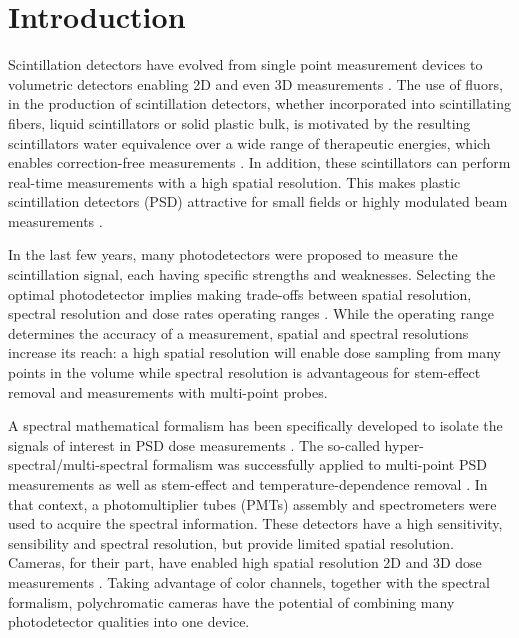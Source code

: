 \documentclass[12pt]{iopart}
\begin{document}
\maketitle

\section{Introduction}

Scintillation detectors have evolved from single point measurement devices to volumetric detectors enabling 2D and even 3D measurements \cite{beaulieu_review_2016}. The use of fluors, in the production of scintillation detectors, whether incorporated into scintillating fibers, liquid scintillators or solid plastic bulk, is motivated by the resulting scintillators water equivalence over a wide range of therapeutic energies, which enables correction-free measurements \cite{beddar_water-equivalent_1992, beddar_water-equivalent_1992-1}. In addition, these scintillators can perform real-time measurements with a high spatial resolution. This makes plastic scintillation detectors (PSD) attractive for small fields or highly modulated beam measurements \cite{Xue_2017_small_field}. 

In the last few years, many photodetectors were proposed to measure the scintillation signal, each having specific strengths and weaknesses. Selecting the optimal photodetector implies making trade-offs between spatial resolution, spectral resolution and dose rates operating ranges \cite{boivin_systematic_2015}. While the operating range determines the accuracy of a measurement, spatial and spectral resolutions increase its reach: a high spatial resolution will enable dose sampling from many points in the volume while spectral resolution is advantageous for stem-effect removal and measurements with multi-point probes. 

A spectral mathematical formalism has been specifically developed to isolate the signals of interest in PSD dose measurements \cite{archambault_mathematical_2012}. The so-called hyper-spectral/multi-spectral formalism was successfully applied to multi-point PSD  measurements as well as stem-effect and temperature-dependence removal \cite{therriault-proulx_development_2012, linares_rosales_optimization_2019, therriault-proulx_method_2015}. In that context, a photomultiplier tubes (PMTs) assembly and spectrometers were used to acquire the spectral information. These detectors have a high sensitivity, sensibility and spectral resolution, but provide limited spatial resolution. Cameras, for their part, have enabled high spatial resolution 2D and 3D dose measurements \cite{goulet_novel_2014, kirov_three-dimensional_2005, alexander_1_nodate}. Taking advantage of color channels, together with the spectral formalism, polychromatic cameras have the potential of combining many photodetector qualities into one device. 
\end{document}
